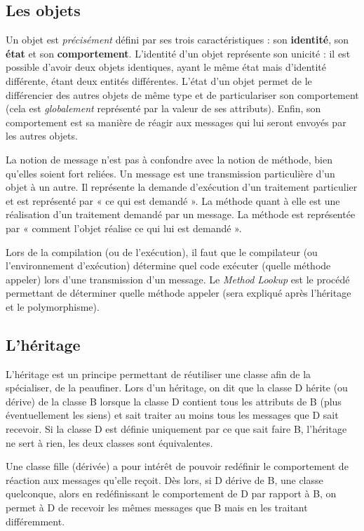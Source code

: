 \documentclass{article}
\begin{document}
	\subsection{Les objets}
		Un objet est \textit{précisément} défini par ses trois caractéristiques : son \textbf{identité}, son \textbf{état} et son \textbf{comportement}. L'identité d'un objet représente
		son unicité : il est possible d'avoir deux objets identiques, ayant le même état mais d'identité différente, étant deux entités différentes. L'état d'un objet permet de le
		différencier des autres objets de même type et de particulariser son comportement (cela est \textit{globalement} représenté par la valeur de ses attributs). Enfin, son comportement
		est sa manière de réagir aux messages qui lui seront envoyés par les autres objets.

		La notion de message n'est pas à confondre avec la notion de méthode, bien qu'elles soient fort reliées. Un message est une transmission particulière d'un objet à un autre. Il
		représente la demande d'exécution d'un traitement particulier et est représenté par « ce qui est demandé ». La méthode quant à elle est une réalisation d'un traitement demandé
		par un message. La méthode est représentée par « comment l'objet réalise ce qui lui est demandé ».

		Lors de la compilation (ou de l'exécution), il faut que le compilateur (ou l'environnement d'exécution) détermine quel code exécuter (quelle méthode appeler) lors d'une
		transmission d'un message. Le \textit{Method Lookup} est le procédé permettant de déterminer quelle méthode appeler (sera expliqué après l'héritage et le polymorphisme).

	\subsection{L'héritage}
		L'héritage est un principe permettant de réutiliser une classe afin de la spécialiser, de la peaufiner. Lors d'un héritage, on dit que la classe D hérite (ou dérive) de
		la classe B lorsque la classe D contient tous les attributs de B (plus éventuellement les siens) et sait traiter au moins tous les messages que D sait recevoir.
		Si la classe D est définie uniquement par ce que sait faire B, l'héritage ne sert à rien, les deux classes sont équivalentes.

		Une classe fille (dérivée) a pour intérêt de pouvoir redéfinir le comportement de réaction aux messages qu'elle reçoit. Dès lors, si D dérive de B, une classe quelconque, alors
		en redéfinissant le comportement de D par rapport à B, on permet à D de recevoir les mêmes messages que B mais en les traitant différemment.
\end{document}
